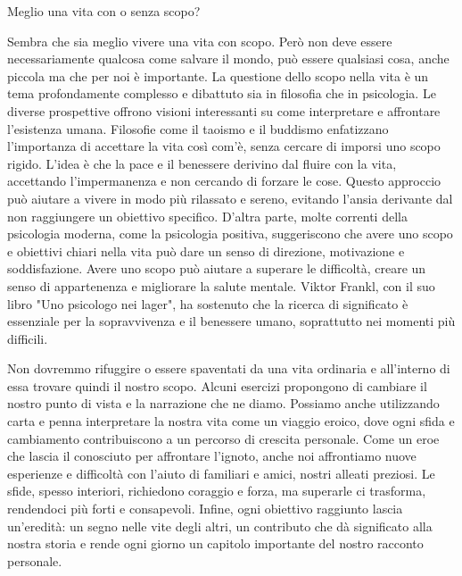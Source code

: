 \documentclass[12pt]{book} %
\begin{document}
\begin{mdframed}[linewidth=1pt]
Meglio una vita con o senza scopo?

Sembra che sia meglio vivere una vita con scopo. Però non deve essere necessariamente qualcosa come salvare il mondo, può essere qualsiasi cosa, anche piccola ma che per noi è importante. La questione dello scopo nella vita è un tema profondamente complesso e dibattuto sia in filosofia che in psicologia. Le diverse prospettive offrono visioni interessanti su come interpretare e affrontare l'esistenza umana. 
Filosofie come il taoismo e il buddismo enfatizzano l'importanza di accettare la vita così com'è, senza cercare di imporsi uno scopo rigido. L'idea è che la pace e il benessere derivino dal fluire con la vita, accettando l'impermanenza e non cercando di forzare le cose. Questo approccio può aiutare a vivere in modo più rilassato e sereno, evitando l'ansia derivante dal non raggiungere un obiettivo specifico.
D'altra parte, molte correnti della psicologia moderna, come la psicologia positiva, suggeriscono che avere uno scopo e obiettivi chiari nella vita può dare un senso di direzione, motivazione e soddisfazione. Avere uno scopo può aiutare a superare le difficoltà, creare un senso di appartenenza e migliorare la salute mentale. Viktor Frankl, con il suo libro "Uno psicologo nei lager", ha sostenuto che la ricerca di significato è essenziale per la sopravvivenza e il benessere umano, soprattutto nei momenti più difficili.

Non dovremmo rifuggire o essere spaventati da una vita ordinaria e all'interno di essa trovare quindi il nostro scopo. Alcuni esercizi propongono di cambiare il nostro punto di vista e la narrazione che ne diamo. Possiamo anche utilizzando carta e penna interpretare la nostra vita come un viaggio eroico, dove ogni sfida e cambiamento contribuiscono a un percorso di crescita personale. Come un eroe che lascia il conosciuto per affrontare l’ignoto, anche noi affrontiamo nuove esperienze e difficoltà con l’aiuto di familiari e amici, nostri alleati preziosi. Le sfide, spesso interiori, richiedono coraggio e forza, ma superarle ci trasforma, rendendoci più forti e consapevoli. Infine, ogni obiettivo raggiunto lascia un’eredità: un segno nelle vite degli altri, un contributo che dà significato alla nostra storia e rende ogni giorno un capitolo importante del nostro racconto personale.


\end{mdframed}
\end{document}
